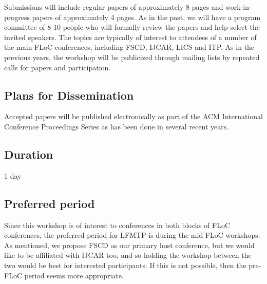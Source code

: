 \documentclass{article}
\begin{document}
   Submissions will include regular papers of approximately 8 pages
   and work-in-progress papers of approximately 4 pages.  As in the
   past, we will have a program committee of 8-10 people who will
   formally review the papers and help select the invited speakers.
   The topics are typically of interest to attendees of a number of
   the main FLoC conferences, including FSCD, IJCAR, LICS and ITP. As
   in the previous years, the workshop will be publicized through
   mailing lists by repeated calls for papers and participation.

\subsection{Plans for Dissemination}

   Accepted papers will be published electronically as part of the ACM
   International Conference Proceedings Series as has been done in
   several recent years.

\subsection{Duration}

   1 day

\subsection{Preferred period}

Since this workshop is of interest to conferences in both blocks of
FLoC conferences, the preferred period for LFMTP is during the mid
FLoC workshops. As mentioned, we propose FSCD as our primary host
conference, but we would like to be affiliated with IJCAR too, and so
holding the workshop between the two would be best for interested
participants. If this is not possible, then the pre-FLoC period seems
more appropriate.
\end{document}
